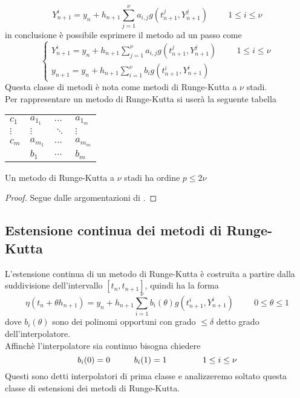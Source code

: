 $$
Y_{n+1}^i = y_n + h_{n+1} \sum_{j=1}^{\nu} a_{i,j} g(t_{n+1}^j,Y_{n+1}^j)
\hspace{1cm}
1 \le i \le \nu
$$
in conclusione è possibile esprimere il metodo ad un passo come
$$
\begin{cases}
\displaystyle
Y_{n+1}^i = y_n + h_{n+1} \sum_{j=1}^{\nu} a_{i,j} g(t_{n+1}^j,Y_{n+1}^j)
\hspace{1cm}
1 \le i \le \nu
\\
\displaystyle
y_{n+1} = y_n + h_{n+1} \sum_{i=1}^{\nu} b_i g (t_{n+1}^i,Y_{n+1}^i)
\end{cases}
$$
Questa classe di metodi è nota come metodi di Runge-Kutta a $\nu$ stadi.
\\[0.5cm]
Per rappresentare un metodo di Runge-Kutta si userà la seguente tabella
\begin{center}
\begin{tabular}{l|lll}
$c_1$ 		& $a_{1_1}$		& $\dots$		& $a_{1_m}$	 	\\
$\vdots$	& $\vdots$		& $\ddots$		& $\vdots$		\\
$c_m$		& $a_{m_1}$		& $\dots$		& $a_{m_m}$		\\
\hline
		& $b_1$			& $\dots$		& $b_m$			\\
\end{tabular}
\end{center}

\begin{thm}
 Un metodo di Runge-Kutta a $\nu$ stadi ha ordine $p \le 2 \nu$
\end{thm}

\begin{proof}
 Segue dalle argomentazioni di \cite[par 4.3]{3}.
\end{proof}


\subsection{Estensione continua dei metodi di Runge-Kutta}
L'estensione continua di un metodo di Runge-Kutta è costruita a partire dalla 
suddivisione dell'intervallo $[t_{n},t_{n+1}]$, quindi ha la forma
$$
\eta(t_n + \theta h_{n+1}) = y_n + h_{n+1} \sum_{i=1}^{\nu} b_i(\theta) g(t_{n+1}^i,Y_{n+1}^i)
\hspace{1cm}
0 \le \theta \le 1
$$
dove $b_i(\theta)$ sono dei polinomi opportuni con grado $\le \delta$ detto grado 
dell'interpolatore.
\vspace{1cm} \\
Affinchè l'interpolatore sia  
 continuo bisogna chiedere
$$
b_i(0)=0	\hspace{1cm}	b_i(1)=1	\hspace{1.5cm}		1 \le i \le \nu
$$
Questi sono detti interpolatori di prima classe e analizzeremo soltato questa classe di estensioni 
dei metodi di Runge-Kutta.


